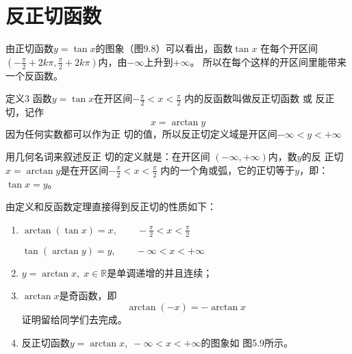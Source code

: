 \section{反正切函数}

由正切函数$y=\tan x$的图象（图9.8）可以看出，函数$\tan x$
在每个开区间$\left(-\frac{\pi}{2}+2k\pi, \frac{\pi}{2}+2k\pi\right)$内，由$-\infty$上升到$+\infty$。
所以在每个这样的开区间里能带来一个反函数。


\begin{figure}[htp]
    \centering
{}
    \caption{}

\end{figure}



\begin{blk}{定义3}
    函数$y=\tan x$在开区间$-\frac{\pi}{2}<x<\frac{\pi}{2}$
内的反函数叫做反正切函数 或 反正
切，记作
\[x=\arctan y\]
因为任何实数都可以作为正
切的值，所以反正切定义域是开区间$-\infty<y<+\infty$
\end{blk}

用几何名词来叙述反正
切的定义就是：在开区间
$(-\infty, +\infty)$内，数$y$的反
正切$x=\arctan y$是在开区间$-\frac{\pi}{2}<x<\frac{\pi}{2}$
内的一个角或弧，它的正切等于$y$，即：$\tan x=y$。

由定义和反函数定理直接得到反正切的性质如下：
\begin{enumerate}
    \item $\arctan (\tan x)=x, \qquad -\frac{\pi}{2}<x<\frac{\pi}{2}$
    
    $\tan (\arctan y)=y,\qquad -\infty<x<+\infty$
    \item $y=\arctan x,\; x\in\mathbb{R}$是单调递增的并且连续；
    \item $\arctan x$是奇函数，即
    \[\arctan (-x)=-\arctan x\]
    证明留给同学们去完成。
    \item 反正切函数$y=\arctan x,\; -\infty<x<+\infty$的图象如
    图5.9所示。
\end{enumerate}

